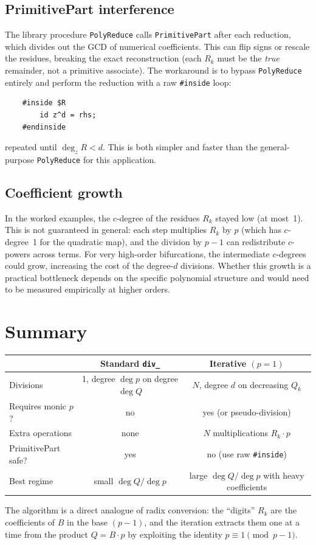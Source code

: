 \documentclass[11pt]{article}
\begin{document}
\subsection{PrimitivePart interference}

The library procedure \texttt{PolyReduce} calls \texttt{PrimitivePart}
after each reduction, which divides out the GCD of numerical coefficients.
This can flip signs or rescale the residues, breaking the exact
reconstruction (each $R_k$ must be the \emph{true} remainder, not a
primitive associate).  The workaround is to bypass \texttt{PolyReduce}
entirely and perform the reduction with a raw \texttt{\#inside} loop:
\begin{verbatim}
    #inside $R
        id z^d = rhs;
    #endinside
\end{verbatim}
repeated until $\deg_z R<d$.  This is both simpler and faster than the
general-purpose \texttt{PolyReduce} for this application.

\subsection{Coefficient growth}

In the worked examples, the $c$-degree of the residues $R_k$ stayed low
(at most~1).  This is not guaranteed in general: each step multiplies $R_k$
by $p$ (which has $c$-degree~1 for the quadratic map), and the division by
$p-1$ can redistribute $c$-powers across terms.  For very high-order
bifurcations, the intermediate $c$-degrees could grow, increasing the cost
of the degree-$d$ divisions.  Whether this growth is a practical bottleneck
depends on the specific polynomial structure and would need to be measured
empirically at higher orders.

\section{Summary}
\label{sec:summary}

\begin{center}
\renewcommand{\arraystretch}{1.3}
\begin{tabular}{lcc}
 & Standard \texttt{div\_} & Iterative $(p{=}1)$ \\\hline
Divisions & 1, degree $\deg p$ on degree $\deg Q$ & $N$, degree $d$ on
  decreasing $Q_k$ \\
Requires monic $p$? & no & yes (or pseudo-division) \\
Extra operations & none & $N$ multiplications $R_k\cdot p$ \\
PrimitivePart safe? & yes & no (use raw \texttt{\#inside}) \\
Best regime & small $\deg Q/\deg p$ & large $\deg Q/\deg p$ with heavy
  coefficients
\end{tabular}
\end{center}

The algorithm is a direct analogue of radix conversion: the ``digits'' $R_k$
are the coefficients of $B$ in the base $(p{-}1)$, and the iteration extracts
them one at a time from the product $Q=B\cdot p$ by exploiting the identity
$p\equiv 1\pmod{p{-}1}$.
\end{document}
